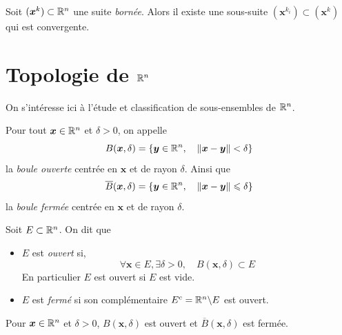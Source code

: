 \begin{theorem} \label{thm: Bolzano-Weierstrass}
	Soit $(\bm x^k) \subset \mathbb{R}^n$ une suite \emph{bornée}. Alors il existe une sous-suite $(\bm x^{k_i}) \subset (\bm x^k)$ qui est convergente.
\end{theorem}


\section{Topologie de $\mathbb{R}^n$}

On s'intéresse ici à l'étude et classification de sous-ensembles de $\mathbb{R}^n$.
\begin{definition}[Boule] \label{def: Boule}
	Pour tout $\bm x \in \mathbb{R}^n$ et $\delta > 0$, on appelle
	\[
	B(\bm x, \delta) = \{ \bm y \in \mathbb{R}^n, \quad \| \bm x - \bm y \| < \delta\}
	\]
	la \emph{boule ouverte} centrée en $\bm x$ et de rayon $\delta$. Ainsi que
	\[
	\overline B (\bm x, \delta) = \{ \bm y \in \mathbb{R}^n, \quad \|  \bm x - \bm y \| \leqslant \delta \}
	\]
	la \emph{boule fermée} centrée en $\bm x$ et de rayon $\delta$.
\end{definition}
\begin{definition} \label{def: ensembles ouverts/fermés}
	Soit $E \subset \mathbb{R}^n$. On dit que 
	\begin{itemize}
		\item $E$ est \emph{ouvert} si,
		\[
		\forall \bm x \in E, \exists \delta > 0, \quad B(\bm x, \delta) \subset E
		\]
		En particulier $E$ est ouvert si $E$ est vide.
		\item $E$ est \emph{fermé} si son complémentaire $E^c = \mathbb{R}^n\backslash E$ est ouvert.
	\end{itemize}
\end{definition}

\begin{proposition}
	Pour $\bm x \in \mathbb{R}^n$ et $\delta > 0$, $B(\bm x, \delta)$ est ouvert et $\overline B(\bm x, \delta)$ est fermée.
\end{proposition}

